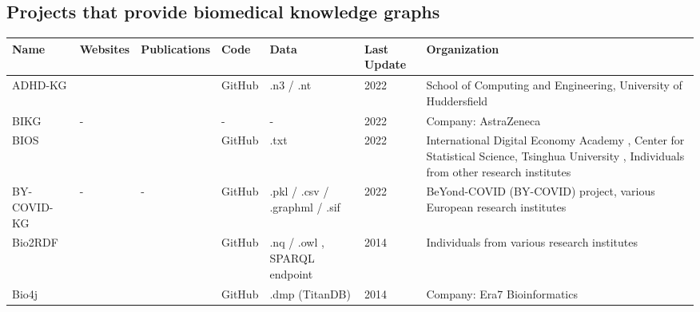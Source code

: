\documentclass{article}
\begin{document}
\newpage
\begin{landscape}

\section{Projects that provide biomedical knowledge graphs}
\label{sec:kg}

\begin{xltabular}{\textwidth}{p{3cm}|p{2.2cm}|p{2.2cm}|p{2.2cm}|p{2.2cm}|p{1cm}|p{6cm}}
Name
&
Websites
&
Publications
&
Code
&
Data
&
Last Update
&
Organization
\\


\hline
\hline


ADHD-KG
&
\cite{adhdkg_website}
&
\cite{adhdkg_publication}
&
GitHub
\cite{adhdkg_github}
&
.n3 / .nt
\cite{adhdkg_github}
\cite{adhdkg_data}
&
2022
&
School of Computing and Engineering, University of Huddersfield
\cite{adhdkg_group}
\\


\hline


BIKG
&
-
&
\cite{bikg_publication}
&
-
&
-
&
2022
&
Company: AstraZeneca
\cite{bikg_group1}
\cite{bikg_group2}
\\


\hline


BIOS
&
\cite{bios_website}
&
\cite{bios_publication}
&
GitHub
\cite{bios_github1}
\cite{bios_github2}
&
.txt
\cite{bios_data}
&
2022
&
International Digital Economy Academy
\cite{bios_group1},
Center for Statistical Science, Tsinghua University
\cite{bios_group2},
Individuals from other research institutes
\\


\hline


BY-COVID-KG
&
-
&
-
&
GitHub
\cite{bycovidkg_github}
&
.pkl / .csv / .graphml / .sif
\cite{bycovidkg_data}
&
2022
&
BeYond-COVID (BY-COVID) project, various European research institutes
\cite{bycovidkg_group}
\\


\hline


Bio2RDF
&
\cite{bio2rdf_website1}
\cite{bio2rdf_website2}
&
\cite{bio2rdf_publication1}
\cite{bio2rdf_publication2}
&
GitHub
\cite{bio2rdf_github}
&
.nq / .owl
\cite{bio2rdf_data1}
\cite{bio2rdf_data2},
SPARQL endpoint
\cite{bio2rdf_data3}
&
2014
&
Individuals from various research institutes
\\


\hline


Bio4j
&
\cite{bio4j_website}
&
\cite{bio4j_publication}
&
GitHub
\cite{bio4j_github1}
\cite{bio4j_github2}
&
.dmp (TitanDB)
\cite{bio4j_data1}
\cite{bio4j_data2}
&
2014
&
Company: Era7 Bioinformatics
\cite{bio4j_group}
\\



\end{xltabular}
\end{landscape}
\end{document}
